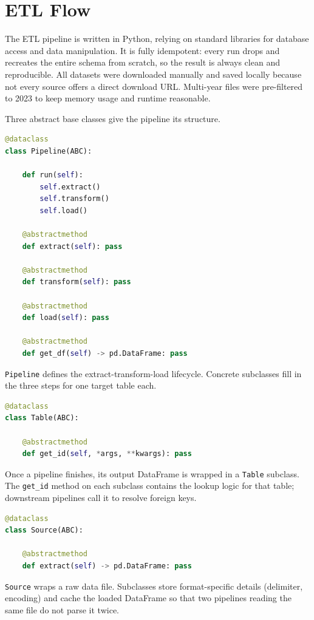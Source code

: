 \documentclass{article}
\begin{document}
	\section{ETL Flow}

	The ETL pipeline is written in Python, relying on standard libraries for database access and data manipulation.
	It is fully idempotent: every run drops and recreates the entire schema from scratch, so the result is always clean and reproducible.
	All datasets were downloaded manually and saved locally because not every source offers a direct download URL. Multi-year files were pre-filtered to 2023 to keep memory usage and runtime reasonable.

	Three abstract base classes give the pipeline its structure.

	\begin{lstlisting}[language=Python]
@dataclass
class Pipeline(ABC):

	def run(self):
		self.extract()
		self.transform()
		self.load()

	@abstractmethod 
	def extract(self): pass

	@abstractmethod
	def transform(self): pass

	@abstractmethod
	def load(self): pass

	@abstractmethod
	def get_df(self) -> pd.DataFrame: pass
	\end{lstlisting}

	\texttt{Pipeline} defines the extract-transform-load lifecycle. Concrete subclasses fill in the three steps for one target table each.

	\begin{lstlisting}[language=Python]
@dataclass
class Table(ABC):

	@abstractmethod
	def get_id(self, *args, **kwargs): pass
	\end{lstlisting}

	Once a pipeline finishes, its output DataFrame is wrapped in a \texttt{Table} subclass. The \texttt{get\_id} method on each subclass contains the lookup logic for that table; downstream pipelines call it to resolve foreign keys.

	\begin{lstlisting}[language=Python]
@dataclass
class Source(ABC):

	@abstractmethod
	def extract(self) -> pd.DataFrame: pass
	\end{lstlisting}

	\texttt{Source} wraps a raw data file. Subclasses store format-specific details (delimiter, encoding) and cache the loaded DataFrame so that two pipelines reading the same file do not parse it twice.
\end{document}
